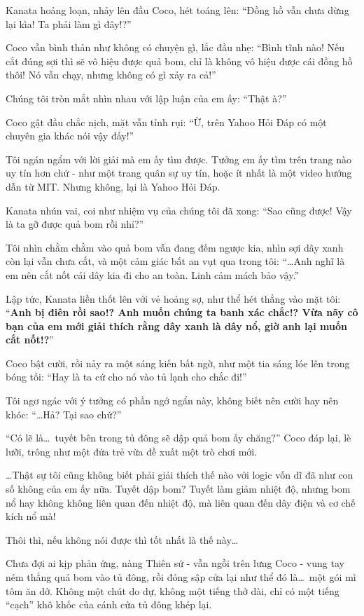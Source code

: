 \documentclass[../main.tex]{subfiles}
\begin{document}
Kanata hoảng loạn, nhảy lên đầu Coco, hét toáng lên: ``Đồng hồ vẫn chưa dừng lại kìa! Ta phải làm gì đây!?''

Coco vẫn bình thản như không có chuyện gì, lắc đầu nhẹ: ``Bình tĩnh nào! Nếu cắt đúng sợi thì sẽ vô hiệu được quả bom, chỉ là không vô hiệu được cái đồng hồ thôi! Nó vẫn chạy, nhưng không có gì xảy ra cả!''

Chúng tôi tròn mắt nhìn nhau với lập luận của em ấy: ``Thật à?''

Coco gật đầu chắc nịch, mặt vẫn tỉnh rụi: ``Ừ, trên Yahoo Hỏi Đáp có một chuyên gia khác nói vậy đấy!''

Tôi ngán ngẩm với lời giải mà em ấy tìm được. Tưởng em ấy tìm trên trang nào uy tín hơn chứ - như một trang quân sự uy tín, hoặc ít nhất là một video hướng dẫn từ MIT. Nhưng không, lại là Yahoo Hỏi Đáp.

Kanata nhún vai, coi như nhiệm vụ của chúng tôi đã xong: ``Sao cũng được! Vậy là ta gỡ được quả bom rồi nhỉ?''

Tôi nhìn chằm chằm vào quả bom vẫn đang đếm ngược kia, nhìn sợi dây xanh còn lại vẫn chưa cắt, và một cảm giác bất an vụt qua trong tôi: ``\dots Anh nghĩ là em nên cắt nốt cái dây kia đi cho an toàn. Linh cảm mách bảo vậy.''

Lập tức, Kanata liền thốt lên với vẻ hoảng sợ, như thể hét thẳng vào mặt tôi: ``\textbf{Anh bị điên rồi sao!? Anh muốn chúng ta banh xác chắc!? Vừa nãy cô bạn của em mới giải thích rằng dây xanh là dây nổ, giờ anh lại muốn cắt nốt!?}''

Coco bật cười, rồi nảy ra một sáng kiến bất ngờ, như một tia sáng lóe lên trong bóng tối: ``Hay là ta cứ cho nó vào tủ lạnh cho chắc đi!''

Tôi ngơ ngác với ý tưởng có phần ngớ ngẩn này, không biết nên cười hay nên khóc: ``\dots Hả? Tại sao chứ?''

``Có lẽ là\dots\ tuyết bên trong tủ đông sẽ dập quả bom ấy chăng?''  Coco đáp lại, lè lưỡi, trông như một đứa trẻ vừa đề xuất một trò chơi mới.

\dots Thật sự tôi cũng không biết phải giải thích thế nào với logic vốn dĩ đã như con số không của em ấy nữa. Tuyết dập bom? Tuyết làm giảm nhiệt độ, nhưng bom nổ hay không không liên quan đến nhiệt độ, mà liên quan đến dây điện và cơ chế kích nổ mà!

Thôi thì, nếu không nói được thì tốt nhất là thế này\dots

\pov{-}

Chưa đợi ai kịp phản ứng, nàng Thiên sứ - vẫn ngồi trên lưng Coco - vung tay ném thẳng quả bom vào tủ đông, rồi đóng sập cửa lại như thể đó là\dots\ một gói mì tôm ăn dở. Không một chút do dự, không một tiếng thở dài, chỉ có một tiếng ``cạch'' khô khốc của cánh cửa tủ đông khép lại.
\end{document}
